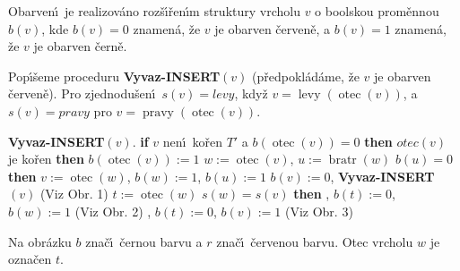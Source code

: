 \documentclass[a4paper,12pt]{article}
\DeclareMathOperator*{\otec}{otec}
\DeclareMathOperator*{\levy}{levy}
\DeclareMathOperator*{\pravy}{pravy}
\DeclareMathOperator*{\bratr}{bratr}
\begin{document}
\flushpar Obarven\'\i\ je realizov\'ano roz\v s\'\i\v ren\'\i m struktury vrcholu $v$ 
o boolskou prom\v ennou $b(v)$, kde $b(v)=0$ znamen\'a, \v ze $v$ je obarven 
\v cerven\v e, a $b(v)=1$ znamen\'a, \v ze $v$ je obarven \v cern\v e.
\medskip

\flushpar Pop\'\i\v seme proceduru {\bf Vyvaz-INSERT$(v)$} (p\v redpokl\'ad\'ame, \v ze 
$v$ je obarven \v cerven\v e). Pro zjednodu\v sen\'\i\ $s(v
)=levy$, kdy\v z $v=\levy(\otec(v))$, a $s(v)=pravy$ pro  
$v=\pravy(\otec(v))$.
\bigskip

{\bf Vyvaz-INSERT$(v)$}.\newline 
{\bf if} $v$ nen\'\i\ ko\v ren $T'$ a $b(\otec(v))=0$ {\bf then}\newline 
\phantom{---}{\bf if} $otec(v)$ je ko\v ren {\bf then}\newline 
\phantom{------}$b(\otec(v)):=1$\newline 
\phantom{---}{\bf else}\newline 
\phantom{------}$w:=\otec(v)$, $u:=\bratr(w)$\newline 
\phantom{------}{\bf if} $b(u)=0$ {\bf then}\newline 
\phantom{---------}$v:=\otec(w)$, $b(w):=1$, $b(u):=1$\newline 
\phantom{---------}$b(v):=0$, {\bf Vyvaz-INSERT$(v)$} (Viz Obr. 1)\newline 
\phantom{------}{\bf else}\newline 
\phantom{---------}$t:=\otec(w)$\newline 
\phantom{---------}{\bf if} $s(w)=s(v)$ {\bf then}\newline 
\phantom{------------}{\bf Rotace$(t,w)$}, $b(t):=0$, $b(w):=1$ (Viz Obr. 2)\newline 
\phantom{---------}{\bf else}\newline 
\phantom{------------}{\bf Dvojita-rotace$(t,w,v)$}, $b(t):=0$, $b(v):=1$ (Viz Obr. 3)\newline 
\phantom{---------}{\bf endif}\newline 
\phantom{------}{\bf endif}\newline 
\phantom{---}{\bf endif\newline 
endif}
\medskip

\flushpar Na obr\'azku $b$ zna\v c\'\i\ \v cernou barvu a $r$ zna\v c\'\i\ \v cervenou 
barvu. Otec vrcholu $w$ je ozna\v cen $t$. 
\medskip

\midinsert
\centerline{}
\endcaption
\endinsert
\end{document}
